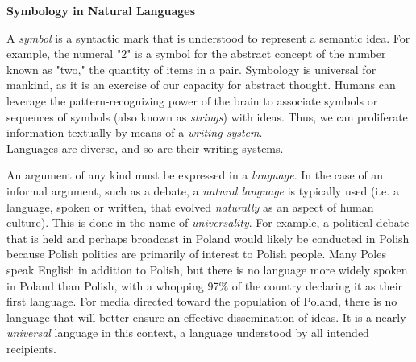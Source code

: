 \begin{tcolorbox}[breakable, enhanced, colback=textbook-blue, sharp corners]
	\vspace{3mm}
	\begin{center}
		\textbf{Symbology in Natural Languages}
	\end{center}
	
	A \textit{symbol} is a syntactic mark that is understood to represent a semantic idea. For example, the numeral "$2$" is a symbol for the abstract concept of the number known as "two," the quantity of items in a pair. Symbology is universal for mankind, as it is an exercise of our capacity for abstract thought. Humans can leverage the pattern-recognizing power of the brain to associate symbols or sequences of symbols (also known as \textit{strings}) with ideas. Thus, we can proliferate information textually by means of a \textit{writing system}. \\
	
	Languages are diverse, and so are their writing systems.
	\vspace{3mm}
\end{tcolorbox}
\vspace{2\baselineskip}


An argument of any kind must be expressed in a \textit{language}. In the case of an informal argument, such as a debate, a \textit{natural language} is typically used (i.e. a language, spoken or written, that evolved \textit{naturally} as an aspect of human culture). This is done in the name of \textit{universality}. For example, a political debate that is held and perhaps broadcast in Poland would likely be conducted in Polish because Polish politics are primarily of interest to Polish people. Many Poles speak English in addition to Polish, but there is no language more widely spoken in Poland than Polish, with a whopping 97\% of the country declaring it as their first language. For media directed toward the population of Poland, there is no language that will better ensure an effective dissemination of ideas. It is a nearly \textit{universal} language in this context, a language understood by all intended recipients. \\

